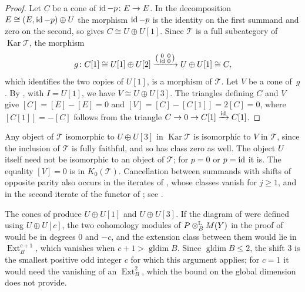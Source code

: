\begin{proof}
  Let $C$ be a cone of ${\id-p\colon E\to E}$. In the decomposition
  ${E\cong(E,\id-p)\oplus U}$ the morphism ${\id-p}$ is the identity on the first
  summand and zero on the second, so  gives
  ${C\cong U\oplus U[1]}$. Since $\mathcal{T}$ is a full subcategory of
  $\operatorname{Kar}\mathcal{T}$, the morphism
  \[
    g\colon C[1]\cong U[1]\oplus U[2]
    \xrightarrow{\left(\begin{smallmatrix}0&0\\\id&0\end{smallmatrix}\right)}
    U\oplus U[1]\cong C,
  \]
  which identifies the two copies of $U[1]$, is a morphism of $\mathcal{T}$.
  Let $V$ be a cone of~$g$. By , with ${I=U[1]}$, we
  have ${V\cong U\oplus U[3]}$. The triangles defining $C$ and $V$ give
  ${[C]=[E]-[E]=0}$ and ${[V]=[C]-[C[1]]=2[C]=0}$, where ${[C[1]]=-[C]}$ follows
  from the triangle ${C\to0\to C[1]\xrightarrow{\id}C[1]}$.
\end{proof}

Any object of $\mathcal{T}$ isomorphic to ${U\oplus U[3]}$ in
$\operatorname{Kar}\mathcal{T}$ is isomorphic to $V$ in $\mathcal{T}$, since
the inclusion of $\mathcal{T}$ is fully faithful, and so has class zero as well.
The object $U$ itself need not be isomorphic to an object of $\mathcal{T}$; for
${p=0}$ or ${p=\id}$ it is. The equality ${[V]=0}$ is in $K_0(\mathcal T)$.
Cancellation between summands with shifts of opposite parity also occurs in the
iterates of , whose classes vanish for ${j\geq1}$,
and in the second iterate of the functor of ; see
.

\begin{remark}
  \label{rem:why-three}
  The cones of  produce ${U\oplus U[1]}$ and
  ${U\oplus U[3]}$. If the diagram of  were defined using
  ${U\oplus U[c]}$, the
  two cohomology modules of ${P\Lotimes[B]M(Y)}$ in the proof of
   would be in degrees $0$ and ${-c}$, and the extension
  class between them would lie in $\operatorname{Ext}^{c+1}_B$, which vanishes
  when ${c+1>\operatorname{gldim}B}$. Since ${\operatorname{gldim}B\leq2}$, the
  shift $3$ is the smallest positive odd integer $c$ for which this argument
  applies; for ${c=1}$ it would need the vanishing of an
  $\operatorname{Ext}^2_B$, which the bound on the global dimension does not
  provide.
\end{remark}

